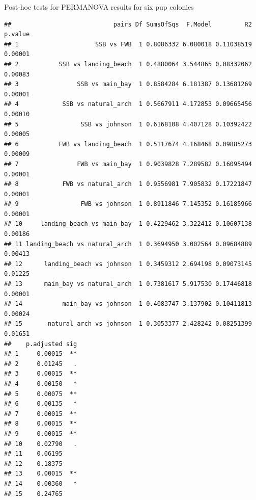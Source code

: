\documentclass[]{article}
\newenvironment{Shaded}{\begin{snugshade}}{\end{snugshade}}
\newcommand{\KeywordTok}[1]{\textcolor[rgb]{0.13,0.29,0.53}{\textbf{#1}}}
\newcommand{\DataTypeTok}[1]{\textcolor[rgb]{0.13,0.29,0.53}{#1}}
\newcommand{\DecValTok}[1]{\textcolor[rgb]{0.00,0.00,0.81}{#1}}
\newcommand{\StringTok}[1]{\textcolor[rgb]{0.31,0.60,0.02}{#1}}
\newcommand{\CommentTok}[1]{\textcolor[rgb]{0.56,0.35,0.01}{\textit{#1}}}
\newcommand{\OperatorTok}[1]{\textcolor[rgb]{0.81,0.36,0.00}{\textbf{#1}}}
\newcommand{\NormalTok}[1]{#1}
\begin{document}
Post-hoc tests for PERMANOVA results for six pup colonies

\begin{Shaded}
\end{Shaded}

\begin{verbatim}
##                            pairs Df SumsOfSqs  F.Model         R2 p.value
## 1                     SSB vs FWB  1 0.8086332 6.080018 0.11038519 0.00001
## 2           SSB vs landing_beach  1 0.4880064 3.544865 0.08332062 0.00083
## 3                SSB vs main_bay  1 0.8584284 6.181387 0.13681269 0.00001
## 4            SSB vs natural_arch  1 0.5667911 4.172853 0.09665456 0.00010
## 5                 SSB vs johnson  1 0.6168108 4.407128 0.10392422 0.00005
## 6           FWB vs landing_beach  1 0.5117674 4.168468 0.09885273 0.00009
## 7                FWB vs main_bay  1 0.9039828 7.289582 0.16095494 0.00001
## 8            FWB vs natural_arch  1 0.9556981 7.905832 0.17221847 0.00001
## 9                 FWB vs johnson  1 0.8911846 7.145352 0.16185966 0.00001
## 10     landing_beach vs main_bay  1 0.4229462 3.322412 0.10607138 0.00186
## 11 landing_beach vs natural_arch  1 0.3694950 3.002564 0.09684889 0.00413
## 12      landing_beach vs johnson  1 0.3459312 2.694198 0.09073145 0.01225
## 13      main_bay vs natural_arch  1 0.7381617 5.917530 0.17446818 0.00001
## 14           main_bay vs johnson  1 0.4083747 3.137902 0.10411813 0.00024
## 15       natural_arch vs johnson  1 0.3053377 2.428242 0.08251399 0.01651
##    p.adjusted sig
## 1     0.00015  **
## 2     0.01245   .
## 3     0.00015  **
## 4     0.00150   *
## 5     0.00075  **
## 6     0.00135   *
## 7     0.00015  **
## 8     0.00015  **
## 9     0.00015  **
## 10    0.02790   .
## 11    0.06195    
## 12    0.18375    
## 13    0.00015  **
## 14    0.00360   *
## 15    0.24765
\end{verbatim}

\begin{Shaded}
\end{Shaded}
\end{document}
